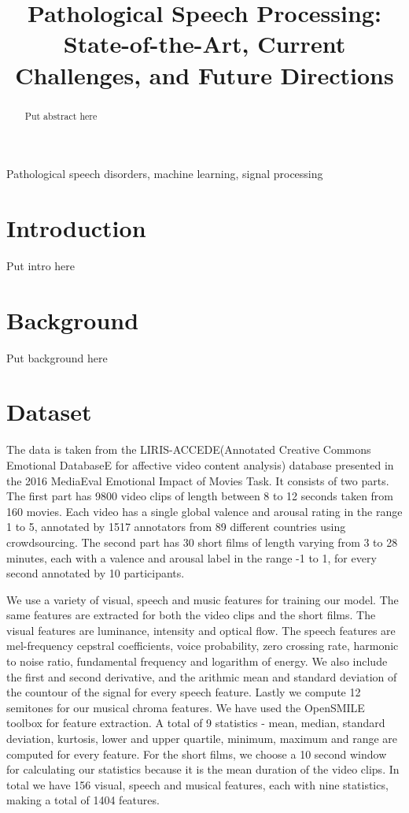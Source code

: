 \documentclass{article}
\title{Pathological Speech Processing:\\State-of-the-Art, Current Challenges, and Future Directions}
\begin{document}
\ninept
%
\maketitle
%
\begin{abstract}
   Put abstract here 
 
\end{abstract}
%
\begin{keywords}
Pathological speech disorders, machine learning, signal processing 
\end{keywords}
%
\section{Introduction}
\label{sec:intro}
Put intro here

\section{Background}
Put background here

\section{Dataset}
The data is taken from the LIRIS-ACCEDE(Annotated Creative Commons Emotional DatabaseE for affective video content analysis) database \cite{baveye2015liris} presented in the 2016 MediaEval Emotional Impact of Movies Task. It consists of two parts. The first part has 9800 video clips of length between 8 to 12 seconds taken from 160 movies. Each video has a single global valence and arousal rating in the range 1 to 5, annotated by 1517 annotators from 89 different countries using crowdsourcing. The second part has 30 short films of length varying from 3 to 28 minutes, each with a valence and arousal label in the range -1 to 1, for every second annotated by 10 participants.

\indent We use a variety of visual, speech and music features for training our model. The same features are extracted for both the video clips and the short films. The visual features are luminance, intensity and optical flow. The speech features are mel-frequency cepstral coefficients, voice probability, zero crossing rate, harmonic to noise ratio, fundamental frequency and logarithm of energy. We also include the first and second derivative, and the arithmic mean and standard deviation of the countour of the signal for every speech feature. Lastly we compute 12 semitones for our musical chroma features. We have used the OpenSMILE toolbox for feature extraction. A total of 9 statistics - mean, median, standard deviation, kurtosis, lower and upper quartile, minimum, maximum and range are computed for every feature. For the short films, we choose a 10 second window for calculating our statistics because it is the mean duration of the video clips. In total we have 156 visual, speech and musical features, each with nine statistics, making a total of 1404 features.
\end{document}
